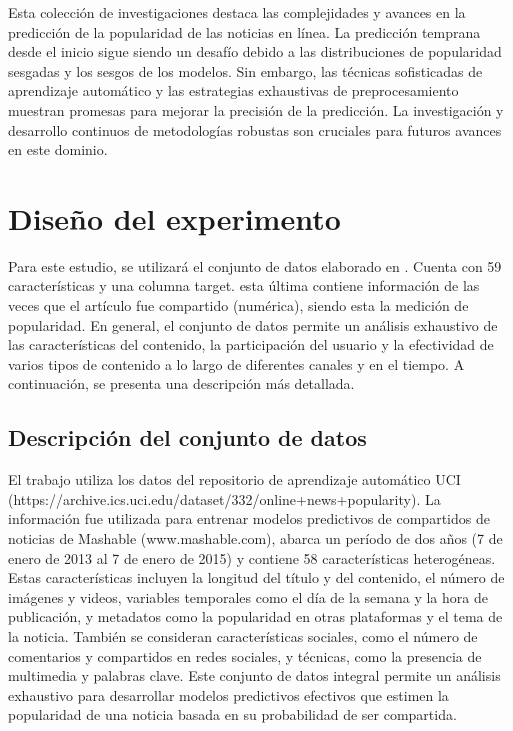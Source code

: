 \documentclass[
  number,
  preprint,
  3p,
  twocolumn]{elsarticle}
\begin{document}
Esta colección de investigaciones destaca las complejidades y avances en
la predicción de la popularidad de las noticias en línea. La predicción
temprana desde el inicio sigue siendo un desafío debido a las
distribuciones de popularidad sesgadas y los sesgos de los modelos. Sin
embargo, las técnicas sofisticadas de aprendizaje automático y las
estrategias exhaustivas de preprocesamiento muestran promesas para
mejorar la precisión de la predicción. La investigación y desarrollo
continuos de metodologías robustas son cruciales para futuros avances en
este dominio.

\section{Diseño del experimento}\label{diseuxf1o-del-experimento}

Para este estudio, se utilizará el conjunto de datos elaborado en
\citep{fernandes2015}. Cuenta con 59 características y una columna
target. esta última contiene información de las veces que el artículo
fue compartido (numérica), siendo esta la medición de popularidad. En
general, el conjunto de datos permite un análisis exhaustivo de las
características del contenido, la participación del usuario y la
efectividad de varios tipos de contenido a lo largo de diferentes
canales y en el tiempo. A continuación, se presenta una descripción más
detallada.

\subsection{Descripción del conjunto de
datos}\label{descripciuxf3n-del-conjunto-de-datos}

El trabajo utiliza los datos del repositorio de aprendizaje automático
UCI (https://archive.ics.uci.edu/dataset/332/online+news+popularity). La
información fue utilizada para entrenar modelos predictivos de
compartidos de noticias de Mashable (www.mashable.com), abarca un
período de dos años (7 de enero de 2013 al 7 de enero de 2015) y
contiene 58 características heterogéneas. Estas características incluyen
la longitud del título y del contenido, el número de imágenes y videos,
variables temporales como el día de la semana y la hora de publicación,
y metadatos como la popularidad en otras plataformas y el tema de la
noticia. También se consideran características sociales, como el número
de comentarios y compartidos en redes sociales, y técnicas, como la
presencia de multimedia y palabras clave. Este conjunto de datos
integral permite un análisis exhaustivo para desarrollar modelos
predictivos efectivos que estimen la popularidad de una noticia basada
en su probabilidad de ser compartida.
\end{document}
